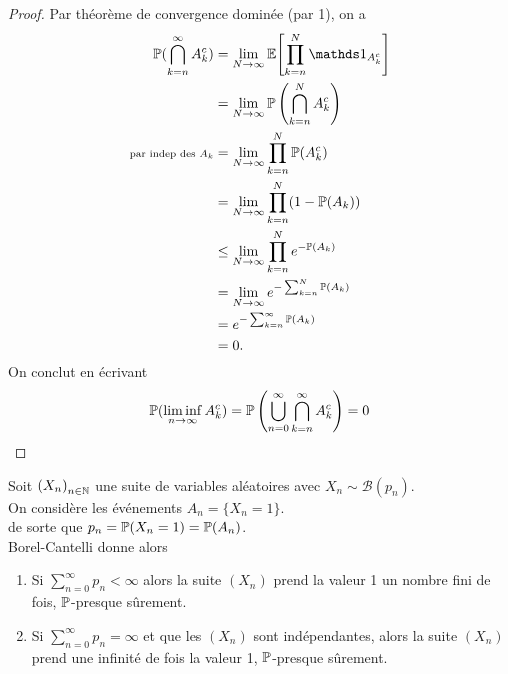 \begin{proof}
    Par théorème de convergence dominée (par 1), on a
    \begin{equation*}
        \begin{aligned}
            \bb P(\bigcap_{k=n}^\infty A_k^c)
            &= \lim_{N\to\infty} \bb E\ff{\prod_{k=n}^N \one_{A_k^c}}\\
            &= \lim_{N\to\infty} \bb P\left( \bigcap_{k=n}^N A_k^c \right)\\
            \smol{par indep des \(A_k\)}&= \lim_{N\to\infty} \prod_{k=n}^N \bb P(A_k^c)\\
            &= \lim_{N\to\infty} \prod_{k=n}^N (1-\bb P(A_k))\\
            &\leq \lim_{N\to\infty} \prod_{k=n}^N e^{-\bb P(A_k)}\\
            &= \lim_{N\to\infty} e^{-\sum_{k=n}^N \bb P(A_k)}\\
            &= e^{-\sum_{k=n}^\infty \bb P(A_k)}\\
            &= 0.
        \end{aligned}
    \end{equation*}
    On conclut en écrivant
    \begin{equation*}
        \mathbb{P}(\liminf_{n\to\infty} A_k^c) = \mathbb{P}\left( \bigcup_{n=0}^\infty \bigcap_{k=n}^\infty A_k^c \right) = 0
    \end{equation*}
\end{proof}

\begin{example}
    Soit \({(X_n)}_{n\in\mathbb{N}}\) une suite de variables aléatoires
    avec \(X_n\sim\mathcal B(p_n)\).\\
    On considère les événements \(A_n = \{X_n = 1\}\).\\
    de sorte que \(p_n = \mathbb{P}(X_n = 1) = \mathbb{P}(A_n)\).\\
    Borel-Cantelli donne alors
    \begin{enumerate}
        \item Si \(\sum_{n=0}^\infty p_n < \infty\) alors la suite \((X_n)\) prend 
        la valeur 1 un nombre fini de fois, \(\mathbb{P}\)-presque sûrement.

        \item Si \(\sum_{n=0}^\infty p_n = \infty\) et que les \((X_n)\) sont 
        indépendantes, alors la suite \((X_n)\) prend une infinité de fois
        la valeur 1, \(\mathbb{P}\)-presque sûrement.
    \end{enumerate}
\end{example}

